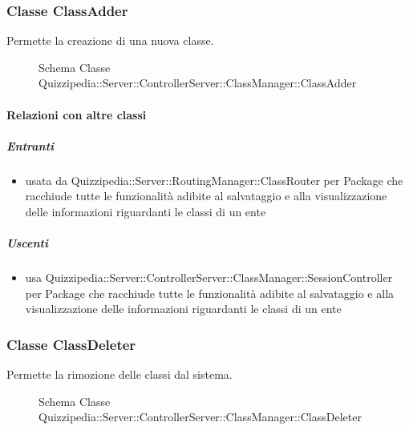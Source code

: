 \subsubsection{Classe ClassAdder}
Permette la creazione di una nuova classe.
\begin{figure}[H]
\centering
\noindent{}
\caption[Schema Classe ClassAdder]{Schema Classe Quizzipedia::Server::ControllerServer::ClassManager::ClassAdder}
\end{figure}
\paragraph{Relazioni con altre classi}
\subparagraph{Entranti}
\begin{itemize}
\item usata da Quizzipedia::Server::RoutingManager::ClassRouter per Package che racchiude tutte le funzionalità adibite al salvataggio e alla visualizzazione delle informazioni riguardanti le classi di un ente
\end{itemize}
\subparagraph{Uscenti}
\begin{itemize}
\item usa Quizzipedia::Server::ControllerServer::ClassManager::SessionController per Package che racchiude tutte le funzionalità adibite al salvataggio e alla visualizzazione delle informazioni riguardanti le classi di un ente
\end{itemize}
\subsubsection{Classe ClassDeleter}
Permette la rimozione delle classi dal sistema.
\begin{figure}[H]
\centering
\noindent{}
\caption[Schema Classe ClassDeleter]{Schema Classe Quizzipedia::Server::ControllerServer::ClassManager::ClassDeleter}
\end{figure}

